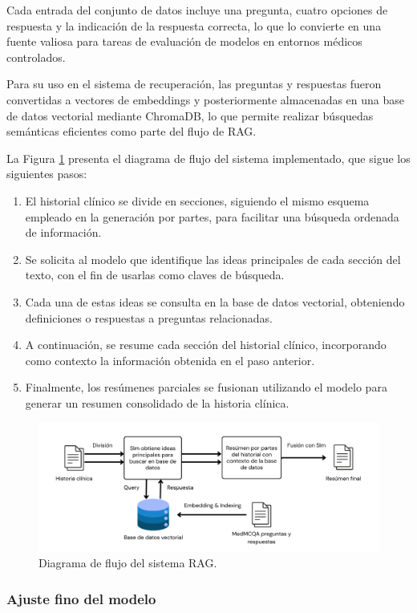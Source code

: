 \documentclass[../main.tex]{subfiles}
\begin{document}
Cada entrada del conjunto de datos incluye una pregunta, cuatro opciones de respuesta y la indicación de la respuesta correcta, lo que lo convierte en una fuente valiosa para tareas de evaluación de modelos en entornos médicos controlados.

Para su uso en el sistema de recuperación, las preguntas y respuestas fueron convertidas a vectores de embeddings y posteriormente almacenadas en una base de datos vectorial mediante ChromaDB, lo que permite realizar búsquedas semánticas eficientes como parte del flujo de RAG.


La Figura \ref{fig:diagrama_rag} presenta el diagrama de flujo del sistema implementado, que sigue los siguientes pasos:

\begin{enumerate}
	\item El historial clínico se divide en secciones, siguiendo el mismo esquema empleado en la generación por partes, para facilitar una búsqueda ordenada de información.
	\item Se solicita al modelo que identifique las ideas principales de cada sección del texto, con el fin de usarlas como claves de búsqueda.
	\item Cada una de estas ideas se consulta en la base de datos vectorial, obteniendo definiciones o respuestas a preguntas relacionadas.
	\item A continuación, se resume cada sección del historial clínico, incorporando como contexto la información obtenida en el paso anterior.
	\item Finalmente, los resúmenes parciales se fusionan utilizando el modelo para generar un resumen consolidado de la historia clínica.
\end{enumerate}

\begin{figure}[H]
	\centering
	\includegraphics[width=.95\textwidth]{images/diagrama-flujo-rag.png}
	\caption{Diagrama de flujo del sistema RAG.}
	\label{fig:diagrama_rag}
\end{figure}
\subsubsection{Ajuste fino del modelo}
\end{document}
